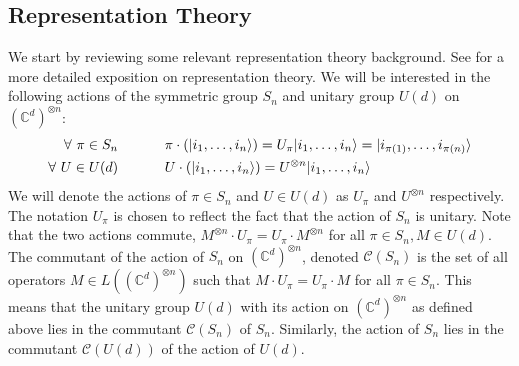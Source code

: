 \documentclass[11pt]{article}
\DeclarePairedDelimiter\ket{\lvert}{\rangle}
\begin{document}
\subsection{Representation Theory}
We start by reviewing some relevant representation theory background. See \cite{Ser97} for a more detailed exposition on representation theory. We will be interested in the following actions of the symmetric group $S_n$ and unitary group $U(d)$ on $(\mathbb{C}^d)^{\otimes n}$:
\begin{align*}
    \forall~\pi \in S_n &~~~~~~~~~~\pi \cdot (\ket{i_1, \ldots, i_n}) = U_\pi  \ket{i_1, \ldots, i_n} =\ket{i_{\pi(1)}, \ldots, i_{\pi(n)}} \\
    \forall~U \in U(d) &~~~~~~~~~~U \cdot (\ket{i_1, \ldots, i_n}) = U^{\otimes n}\ket{i_1, \ldots, i_n}
\end{align*}
We will denote the actions of $\pi \in S_n$ and $U \in U(d)$ as $U_\pi$ and $U^{\otimes n}$ respectively. The notation $U_\pi$ is chosen to reflect the fact that the action of $S_n$ is unitary. Note that the two actions commute, $M^{\otimes n} \cdot U_\pi = U_\pi \cdot M^{\otimes n}$ for all $\pi \in S_n, M \in U(d)$. The commutant of the action of $S_n$ on $(\mathbb{C}^d)^{\otimes n}$, denoted $\mathcal C(S_n)$ is the set of all operators $M \in L((\mathbb{C}^d)^{\otimes n})$ such that $M \cdot U_\pi = U_\pi \cdot M$ for all $\pi \in S_n$. This means that the unitary group $U(d)$ with its action on $(\mathbb{C}^d)^{\otimes n}$ as defined above lies in the commutant $\mathcal{C}(S_n)$ of $S_n$. Similarly, the action of $S_n$ lies in the commutant $\mathcal{C}(U(d))$ of the action of $U(d)$.
\end{document}
